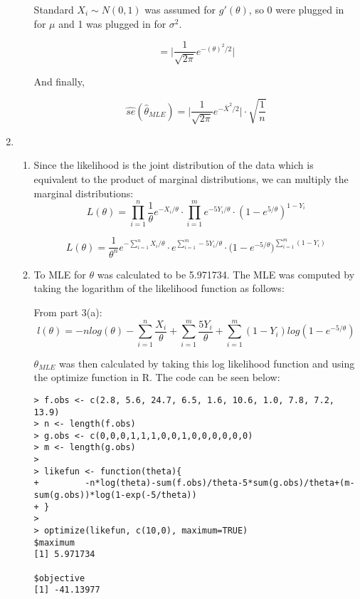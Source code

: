 \documentclass[letterpaper]{article}
\begin{document}
\begin{enumerate}
\begin{enumerate}
Standard $X_{i} \sim N(0,1)$ was assumed for $g'(\theta)$, so 0 were plugged in for $\mu$ and 1 was plugged in for $\sigma^{2}$.

$$ = \Bigg| \frac{1}{\sqrt{2\pi}}e^{-(\theta)^{2}/2} \Bigg| $$

And finally, 

$$ \hat{se}(\hat{\theta}_{MLE}) = \Bigg|\frac{1}{\sqrt{2\pi}}e^{-\bar{X}^{2}/2}\Bigg| \cdot \sqrt{\frac{1}{n}} $$


\end{enumerate}
\item
\begin{enumerate}
\item 
Since the likelihood is the joint distribution of the data which is equivalent to the product of marginal distributions, we can multiply the marginal distributions: 
$$ L(\theta) = \prod\limits_{i=1}^{n} \frac{1}{\theta} e^{-{X_{i}/\theta}} \cdot \prod\limits_{i=1}^{m}e^{-5Y_{i}/\theta}\cdot (1 - e^{5/\theta})^{1-Y_{i}} $$

$$ L(\theta) = \frac{1}{\theta^{n}}e^{-\sum\limits^{n}_{i=1}X_{i}/\theta} \cdot e^{\sum\limits^{m}_{i=1}-5Y_{i}/\theta} \cdot \big(1 - e^{-5/\theta}\big)^{\sum\limits^{m}_{i=1}(1-Y_{i})} $$

\item 
To MLE for $\theta$ was calculated to be 5.971734. The MLE was computed by taking the logarithm of the likelihood function as follows:

From part 3(a):
$$l(\theta) = -nlog(\theta) - \sum^{n}_{i=1}{\frac{X_{i}}{\theta}} + \sum^{m}_{i=1}{\frac{5Y_{i}}{\theta}} + \sum^{m}_{i=1}{(1-Y_{i})log(1-e^{-5/\theta})}$$


$\theta_{MLE}$ was then calculated by taking this log likelihood function and using the optimize function in R. The code can be seen below:

\begin{verbatim}
> f.obs <- c(2.8, 5.6, 24.7, 6.5, 1.6, 10.6, 1.0, 7.8, 7.2, 13.9)
> n <- length(f.obs)
> g.obs <- c(0,0,0,1,1,1,0,0,1,0,0,0,0,0,0)
> m <- length(g.obs)
> 
> likefun <- function(theta){
+         -n*log(theta)-sum(f.obs)/theta-5*sum(g.obs)/theta+(m-sum(g.obs))*log(1-exp(-5/theta))
+ } 
> 
> optimize(likefun, c(10,0), maximum=TRUE)
$maximum
[1] 5.971734

$objective
[1] -41.13977

\end{verbatim}

\end{enumerate}
\end{enumerate}
\end{document}
